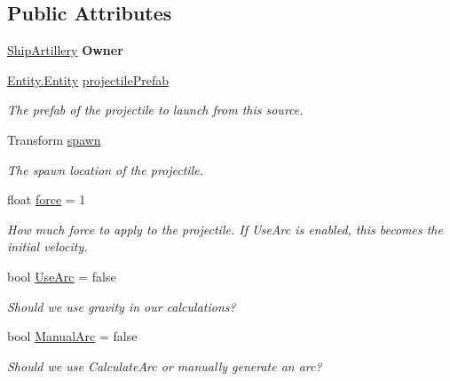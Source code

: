 \subsection*{Public Attributes}
\begin{DoxyCompactItemize}
\item 
\hypertarget{class_skyrates_1_1_mono_1_1_shooter_aeacc6b44034279291d7c03bedf3e928f}{\hyperlink{class_skyrates_1_1_ship_1_1_ship_artillery}{Ship\-Artillery} {\bfseries Owner}}\label{class_skyrates_1_1_mono_1_1_shooter_aeacc6b44034279291d7c03bedf3e928f}

\item 
\hyperlink{class_skyrates_1_1_entity_1_1_entity}{Entity.\-Entity} \hyperlink{class_skyrates_1_1_mono_1_1_shooter_a3eb3006b65f8ca3e5640e2d04658139f}{projectile\-Prefab}
\begin{DoxyCompactList}\small\item\em The prefab of the projectile to launch from this source. \end{DoxyCompactList}\item 
Transform \hyperlink{class_skyrates_1_1_mono_1_1_shooter_aa936f850ff75524adc350c2c3a6763ed}{spawn}
\begin{DoxyCompactList}\small\item\em The spawn location of the projectile. \end{DoxyCompactList}\item 
float \hyperlink{class_skyrates_1_1_mono_1_1_shooter_a472c3ebcb2adf214c1fbeafd7c32c0ae}{force} = 1
\begin{DoxyCompactList}\small\item\em How much force to apply to the projectile. If Use\-Arc is enabled, this becomes the initial velocity. \end{DoxyCompactList}\item 
bool \hyperlink{class_skyrates_1_1_mono_1_1_shooter_a15bb2b7cdbb581dec901f16f930d0b8c}{Use\-Arc} = false
\begin{DoxyCompactList}\small\item\em Should we use gravity in our calculations? \end{DoxyCompactList}\item 
bool \hyperlink{class_skyrates_1_1_mono_1_1_shooter_a1c85cc6a77bdcddc41c7cf70506f3309}{Manual\-Arc} = false
\begin{DoxyCompactList}\small\item\em Should we use Calculate\-Arc or manually generate an arc? \end{DoxyCompactList}\item 

\end{DoxyCompactItemize}
